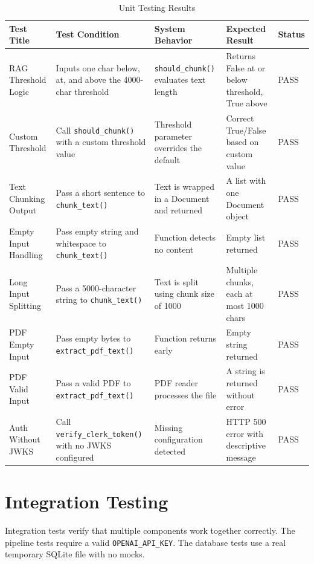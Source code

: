 \begin{table}[h]
\centering
\begin{tabular}{|p{3.2cm}|p{3cm}|p{3.5cm}|p{3.5cm}|p{1.8cm}|}
\hline
\textbf{Test Title} & \textbf{Test Condition} & \textbf{System Behavior} & \textbf{Expected Result} & \textbf{Status} \\
\hline
RAG Threshold Logic & Inputs one char below, at, and above the 4000-char threshold & \texttt{should\_chunk()} evaluates text length & Returns False at or below threshold, True above & PASS \\
\hline
Custom Threshold & Call \texttt{should\_chunk()} with a custom threshold value & Threshold parameter overrides the default & Correct True/False based on custom value & PASS \\
\hline
Text Chunking Output & Pass a short sentence to \texttt{chunk\_text()} & Text is wrapped in a Document and returned & A list with one Document object & PASS \\
\hline
Empty Input Handling & Pass empty string and whitespace to \texttt{chunk\_text()} & Function detects no content & Empty list returned & PASS \\
\hline
Long Input Splitting & Pass a 5000-character string to \texttt{chunk\_text()} & Text is split using chunk size of 1000 & Multiple chunks, each at most 1000 chars & PASS \\
\hline
PDF Empty Input & Pass empty bytes to \texttt{extract\_pdf\_text()} & Function returns early & Empty string returned & PASS \\
\hline
PDF Valid Input & Pass a valid PDF to \texttt{extract\_pdf\_text()} & PDF reader processes the file & A string is returned without error & PASS \\
\hline
Auth Without JWKS & Call \texttt{verify\_clerk\_token()} with no JWKS configured & Missing configuration detected & HTTP 500 error with descriptive message & PASS \\
\hline
\end{tabular}
\caption{Unit Testing Results}
\end{table}

\section{Integration Testing}

Integration tests verify that multiple components work together correctly. The pipeline tests require a valid \texttt{OPENAI\_API\_KEY}. The database tests use a real temporary SQLite file with no mocks.

